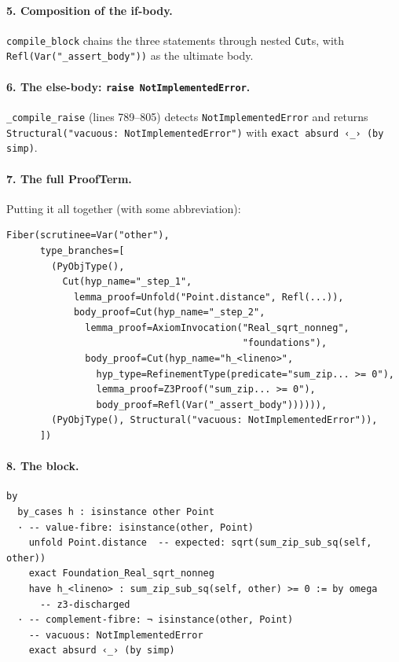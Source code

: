 \paragraph{5. Composition of the if-body.}
\texttt{compile\_block} chains the three statements through nested
\texttt{Cut}s, with \texttt{Refl(Var("\_assert\_body"))} as the
ultimate body.

\paragraph{6. The else-body: \texttt{raise NotImplementedError}.}
\texttt{\_compile\_raise} (lines 789--805) detects
\texttt{NotImplementedError} and returns
\texttt{Structural("vacuous: NotImplementedError")} with \Lean{}
\verb|exact absurd ‹_› (by simp)|.

\paragraph{7. The full ProofTerm.}
Putting it all together (with some abbreviation):

\begin{verbatim}
Fiber(scrutinee=Var("other"),
      type_branches=[
        (PyObjType(),
          Cut(hyp_name="_step_1",
            lemma_proof=Unfold("Point.distance", Refl(...)),
            body_proof=Cut(hyp_name="_step_2",
              lemma_proof=AxiomInvocation("Real_sqrt_nonneg",
                                          "foundations"),
              body_proof=Cut(hyp_name="h_<lineno>",
                hyp_type=RefinementType(predicate="sum_zip... >= 0"),
                lemma_proof=Z3Proof("sum_zip... >= 0"),
                body_proof=Refl(Var("_assert_body")))))),
        (PyObjType(), Structural("vacuous: NotImplementedError")),
      ])
\end{verbatim}

\paragraph{8. The \Lean{} block.}

\begin{lstlisting}[language=lean4]
by
  by_cases h : isinstance other Point
  · -- value-fibre: isinstance(other, Point)
    unfold Point.distance  -- expected: sqrt(sum_zip_sub_sq(self, other))
    exact Foundation_Real_sqrt_nonneg
    have h_<lineno> : sum_zip_sub_sq(self, other) >= 0 := by omega
      -- z3-discharged
  · -- complement-fibre: ¬ isinstance(other, Point)
    -- vacuous: NotImplementedError
    exact absurd ‹_› (by simp)
\end{lstlisting}

